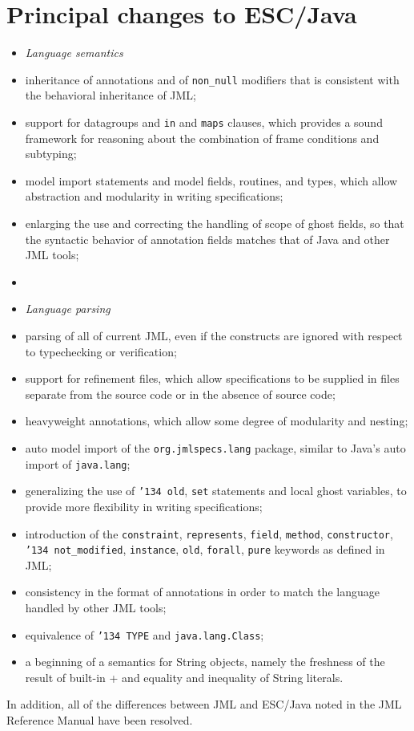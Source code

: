 \documentclass{llncs}
\begin{document}
\section{Principal changes to ESC/Java}
\setlength{\partopsep}{0in}\setlength{\parskip}{0in}\setlength{\itemsep}{0in}\setlength{\topsep}{0in}
\begin{itemize}
\setlength{\partopsep}{0in}\setlength{\parskip}{0in}\setlength{\itemsep}{0in}\setlength{\topsep}{0in}
\item[] \textit{Language semantics}
\item inheritance of annotations and of \texttt{non\_null}
  modifiers that is consistent with the behavioral inheritance of JML;
\item support for datagroups and \texttt{in} and \texttt{maps} clauses, which provides a sound framework for reasoning about the combination of frame conditions and subtyping;
\item model import statements and model fields, routines, and types, which allow abstraction 
and modularity in writing specifications;
\item enlarging the use and correcting the handling of scope of ghost fields, so that the syntactic behavior 
of annotation fields matches that of Java and other JML tools;
\item[]
\item[] \textit{Language parsing}
\item parsing of all of current JML, even if the constructs are
  ignored with respect to typechecking or verification;
\item support for refinement files, which allow specifications to be supplied in files separate from the source code or in the absence of source code;
\item heavyweight annotations, which allow some degree of modularity and nesting;
\item auto model import of the \texttt{org.jmlspecs.lang} package, similar to Java's auto import of \texttt{java.lang};
\item generalizing the use of \texttt{\char'134 old}, \texttt{set} statements and local ghost variables, to provide more flexibility in writing specifications;
\item introduction of the \texttt{constraint}, \texttt{represents}, \texttt{field}, \texttt{method},
\texttt{constructor}, 
\texttt{\char'134 not\_modified}, \texttt{instance}, \texttt{old}, \texttt{forall},
\texttt{pure} keywords as defined in JML;
\item consistency in the format of annotations in order to match the language handled by other JML tools;
\item equivalence of \texttt{\char'134 TYPE} and \texttt{java.lang.Class};
\item a beginning of a semantics for String objects, namely the freshness of the result of built-in +
and equality and inequality of String literals.
\end{itemize}
In addition, all of the differences between JML and ESC/Java noted in
the JML Reference Manual have been resolved.
\end{document}

